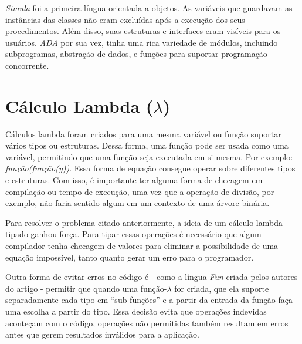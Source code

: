 \documentclass{article}
\begin{document}
\emph{Simula} foi a primeira língua orientada a objetos. As variáveis que guardavam as instâncias das classes não eram excluídas após a execução dos seus procedimentos. Além disso, suas estruturas e interfaces eram visíveis para os usuários.
\emph{ADA} por sua vez, tinha uma rica variedade de módulos, incluindo subprogramas, abstração de dados, e funções para suportar programação concorrente.

\section{Cálculo Lambda ($\lambda$)}

\hspace{10pt} Cálculos lambda foram criados para uma mesma variável ou função suportar vários tipos ou estruturas. Dessa forma, uma função pode ser usada como uma variável, permitindo que uma função seja executada em si mesma. Por exemplo: 
\emph{função(função(y))}. Essa forma de equação consegue operar sobre diferentes tipos e estruturas. Com isso, é importante ter alguma forma de checagem em compilação ou tempo de execução, uma vez que a operação de divisão, por exemplo, não faria sentido algum em um contexto de uma árvore binária.

Para resolver o problema citado anteriormente, a ideia de um cálculo lambda tipado ganhou força. Para tipar essas operações é necessário que algum compilador tenha checagem de valores para eliminar a possibilidade de uma equação impossível, tanto quanto gerar um erro para o programador.

Outra forma de evitar erros no código é - como a língua \emph{Fun} criada pelos autores do artigo - permitir que quando uma função-$\lambda$ for criada, que ela suporte separadamente cada tipo em ``sub-funções” e a partir da entrada da função faça uma escolha a partir do tipo. Essa decisão evita que operações indevidas aconteçam com o código, operações não permitidas também resultam em erros antes que gerem resultados inválidos para a aplicação.
\end{document}
